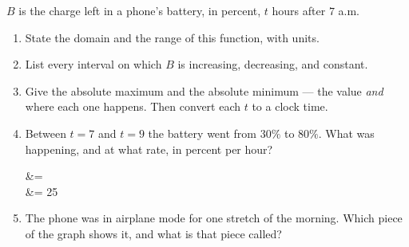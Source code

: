 \documentclass[10pt]{article}
\begin{document}
\vspace{0.10in}

\boxguard[30]
\begin{tcolorbox}[colback=white, colframe=black!40,
    title=\textbf{Tier A --- Approaching Proficiency},
    fonttitle=\bfseries, arc=2mm, left=3mm, right=3mm, top=2mm, bottom=2mm, breakable]
\small
$B$ is the charge left in a phone's battery, in percent, $t$ hours after $7$ a.m.

\begin{center}
\end{center}

\begin{enumerate}[leftmargin=1.6em, itemsep=4pt, topsep=2pt]
  \item State the domain and the range of this function, with units.


  \item List every interval on which $B$ is increasing, decreasing, and constant.


  \item Give the absolute maximum and the absolute minimum --- the value \emph{and} where each
        one happens. Then convert each $t$ to a clock time.


  \item Between $t=7$ and $t=9$ the battery went from $30\%$ to $80\%$. What was happening, and
        at what rate, in percent per hour?
\begin{work}
   &=  \\
              &= 25 
\end{work}

  \item The phone was in airplane mode for one stretch of the morning. Which piece of the graph
        shows it, and what is that piece called?

\end{enumerate}
\end{tcolorbox}
\end{document}
